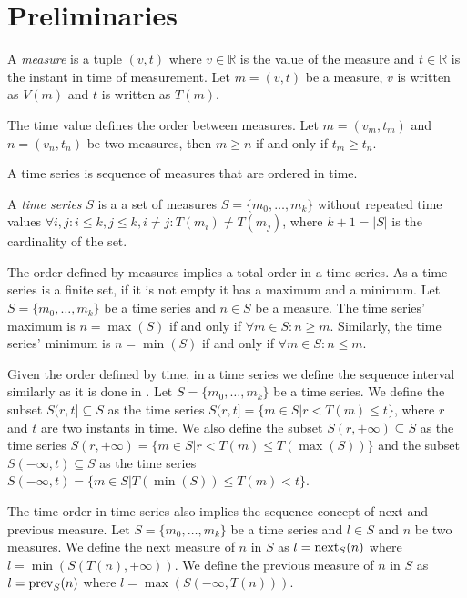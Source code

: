 \section{Preliminaries}

A \emph{measure} is a tuple $(v,t)$ where $v\in{\mathbb{R}}$ is the
value of the measure and $t \in \mathbb{R}$ is the instant in time of
measurement. Let $m = (v,t)$ be a measure, $v$ is written as $V(m)$
and $t$ is written as $T(m)$.

The time value defines the order between measures.  Let $m = (v_m,
t_m)$ and $n = (v_n, t_n)$ be two measures, then $m\geq n$ if and only
if $t_m\geq t_n$.

A time series is sequence of measures that are ordered in time. 
\begin{definition}
  A \emph{time series} $S$ is a a set of measures $S = \{m_0, \ldots,
  m_k\}$ without repeated time values $\forall i,j: i\leq k, j\leq k,
  i\neq j : T(m_i)\neq T(m_j)$, where $k+1=|S|$ is the cardinality of
  the set.
\end{definition}

The order defined by measures implies a total order in a time
series. As a time series is a finite set, if it is not empty it has a
maximum and a minimum.  Let $S=\{m_0,\ldots,m_k\}$ be a time series
and $n\in S$ be a measure. The time series' maximum is $n=\max(S)$ if
and only if $\forall m \in S: n \geq m $.  Similarly, the time series'
minimum is $n=\min(S)$ if and only if $\forall m \in S: n \leq m$.

Given the order defined by time, in a time series we define the
sequence interval similarly as it is done in
\cite{last:keogh,last:hetland}.  Let $S=\{m_0, \ldots, m_k\}$ be a
time series. We define the subset $S(r,t] \subseteq S$ as the time
series $S(r,t]=\{m\in S | r<T(m)\leq t\}$, where $r$ and $t$ are two
instants in time.  We also define the subset $S(r,+\infty)\subseteq S$
as the time series $S(r,+\infty) = \{m\in S | r< T(m) \leq
T(\max(S))\}$ and the subset $S(-\infty,t)\subseteq S$ as the time
series $S(-\infty,t) = \{m\in S | T(\min(S))\leq T(m) < t\}$.


The time order in time series also implies the sequence concept of
next and previous measure.  Let $S=\{m_0, \ldots, m_k\}$ be a time
series and $l\in S$ and $n$ be two measures. We define the next
measure of $n$ in $S$ as $l=\operatorname*{next}_S(n)$ where $l =
\min(S(T(n),+\infty))$. We define the previous measure of $n$ in $S$
as $l=\operatorname*{prev}_S(n)$ where $l = \max(S(-\infty,T(n)))$.


